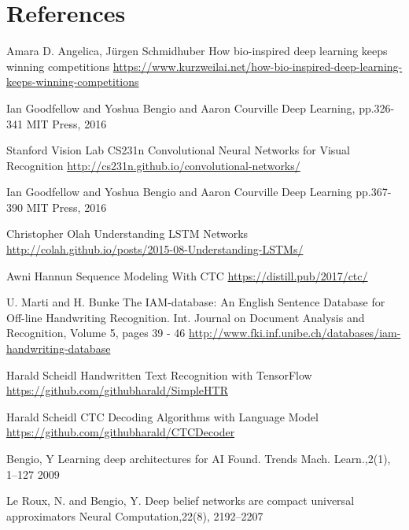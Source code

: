 \documentclass{article}
\begin{document}
\newpage
\section{References}
\begin{thebibliography}{9}
    
    Amara D. Angelica, Jürgen Schmidhuber
    \newblock How bio-inspired deep learning keeps winning competitions
    \newblock \url{https://www.kurzweilai.net/how-bio-inspired-deep-learning-keeps-winning-competitions}
    
    Ian Goodfellow and Yoshua Bengio and Aaron Courville
    \newblock Deep Learning, pp.326-341
    \newblock MIT Press, 2016
    
    Stanford Vision Lab
    \newblock CS231n Convolutional Neural Networks for Visual Recognition
    \newblock \url{http://cs231n.github.io/convolutional-networks/}
    
    Ian Goodfellow and Yoshua Bengio and Aaron Courville
    \newblock Deep Learning pp.367-390 
    \newblock MIT Press, 2016
    
    Christopher Olah
    \newblock Understanding LSTM Networks
    \newblock \url{http://colah.github.io/posts/2015-08-Understanding-LSTMs/}

    Awni Hannun
    \newblock Sequence Modeling With CTC
    \newblock \url{https://distill.pub/2017/ctc/}
    
    U. Marti and H. Bunke
    \newblock The IAM-database: An English Sentence Database for Off-line Handwriting Recognition. Int. Journal on Document Analysis and Recognition, Volume 5, pages 39 - 46
    \newblock \url{http://www.fki.inf.unibe.ch/databases/iam-handwriting-database}
    
    Harald Scheidl
    \newblock Handwritten Text Recognition with TensorFlow
    \newblock \url{https://github.com/githubharald/SimpleHTR}
    
    Harald Scheidl
    \newblock CTC Decoding Algorithms with Language Model
    \newblock \url{https://github.com/githubharald/CTCDecoder}
    
    Bengio, Y
    \newblock Learning deep architectures for AI
    \newblock Found. Trends Mach. Learn.,2(1), 1–127 2009

    Le Roux, N. and Bengio, Y.
    \newblock Deep belief networks are compact universal approximators
    \newblock Neural Computation,22(8), 2192–2207
    

\end{thebibliography}
\end{document}
